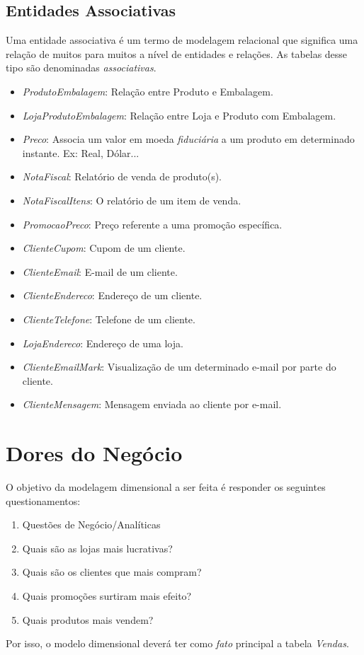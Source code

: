 \subsection{Entidades Associativas}

Uma entidade associativa é um termo de modelagem relacional que significa uma relação de muitos para muitos a nível de entidades e relações. As tabelas desse tipo são denominadas \emph{associativas}.

\begin{itemize}
\item \emph{ProdutoEmbalagem}: Relação entre Produto e Embalagem.
\item \emph{LojaProdutoEmbalagem}: Relação entre Loja e Produto com Embalagem.
\item \emph{Preco}: Associa um valor em moeda \emph{fiduciária} a um produto em determinado instante. Ex: Real, Dólar...
\item \emph{NotaFiscal}: Relatório de venda de produto(s).
\item \emph{NotaFiscalItens}: O relatório de um item de venda.
\item \emph{PromocaoPreco}: Preço referente a uma promoção específica.
\item \emph{ClienteCupom}: Cupom de um cliente.
\item \emph{ClienteEmail}: E-mail de um cliente.
\item \emph{ClienteEndereco}: Endereço de um  cliente.
\item \emph{ClienteTelefone}: Telefone de um cliente.
\item \emph{LojaEndereco}: Endereço de uma loja.
\item \emph{ClienteEmailMark}: Visualização de um determinado e-mail por parte do cliente.
\item \emph{ClienteMensagem}: Mensagem enviada ao cliente por e-mail.
\end{itemize}

\section{Dores do Negócio}
\label{section:BusinessPains}
O objetivo da modelagem dimensional a ser feita é responder os seguintes questionamentos:

\begin{enumerate}
\item Questões de Negócio/Analíticas
\item Quais são as lojas mais lucrativas?
\item Quais são os clientes que mais compram?
\item Quais promoções surtiram mais efeito?
\item Quais produtos mais vendem?
\end{enumerate}

Por isso, o modelo dimensional deverá ter como \emph{fato} principal a tabela \emph{Vendas}.
